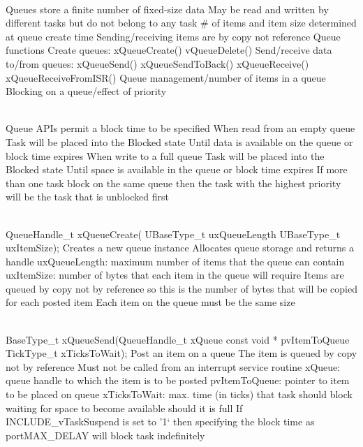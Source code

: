 \begin{description}
\os{\newpage}



\item[{\rot\bf FreeRTOS Queues}]~\\[-3ex]
\bi
\ite Queues store a finite number of fixed-size data
\bi
\ite May be read and written by different tasks but do not belong to any task
\ite # of items and item size determined at queue create time
\ite Sending/receiving items are by copy not reference
\ei
\ite Queue functions
\bi
\ite Create queues: xQueueCreate() vQueueDelete()
\ite Send/receive data to/from queues: xQueueSend() xQueueSendToBack() xQueueReceive() xQueueReceiveFromISR()
\ite Queue management/number of items in a queue
\ite Blocking on a queue/effect of priority
\ei
\ei

\os{\newpage}



\item[{\rot\bf Blocking on Queues}]~\\[-3ex]
\bi
\ite Queue APIs permit a block time to be specified
\ite When read from an empty queue
\bi
\ite Task will be placed into the Blocked state
\ite Until data is available on the queue or block time expires
\ei
\ite When write to a full queue
\bi
\ite Task will be placed into the Blocked state
\ite Until space is available in the queue or block time expires
\ei
\ite If more than one task block on the same queue then the task with the highest priority will be the task that is unblocked first
\ei

\os{\newpage}



\item[{\rot\bf Queue Creation}]~\\[-3ex]
\bi
\ite QueueHandle_t xQueueCreate(
\ite     UBaseType_t uxQueueLength
\ite     UBaseType_t uxItemSize);
\ite Creates a new queue instance
\bi
\ite Allocates queue storage and returns a handle
\ite uxQueueLength: maximum number of items that the queue can contain
\ite uxItemSize: number of bytes that each item in the queue will require
\bi
\ite Items are queued by copy not by reference so this is the number of bytes that will be copied for each posted item
\ei
\ite Each item on the queue must be the same size
\ei
\ei

\os{\newpage}



\item[{\rot\bf Send Data through Queues}]~\\[-3ex]
\bi
\ite BaseType_t xQueueSend(QueueHandle_t xQueue
\ite       const void * pvItemToQueue
\ite       TickType_t xTicksToWait);
\ite Post an item on a queue
\bi
\ite The item is queued by copy not by reference
\ite Must not be called from an interrupt service routine
\ite xQueue:  queue handle to which the item is to be posted
\ite pvItemToQueue: pointer to item to be placed on queue
\ite xTicksToWait: max. time (in ticks) that task should block waiting for space to become available should it is full
\ite If INCLUDE_vTaskSuspend is set to '1‘ then specifying the block time as portMAX_DELAY will block task indefinitely
\ei
\ei


\end{description}
